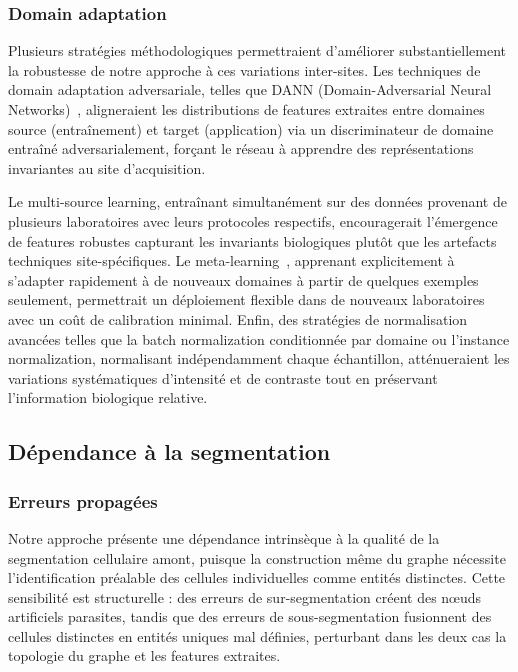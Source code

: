 \subsubsection{Domain adaptation}

Plusieurs stratégies méthodologiques permettraient d'améliorer substantiellement la robustesse de notre approche à ces variations inter-sites. Les techniques de domain adaptation adversariale, telles que DANN (Domain-Adversarial Neural Networks)~\cite{Ganin2015,Ganin2016}, aligneraient les distributions de features extraites entre domaines source (entraînement) et target (application) via un discriminateur de domaine entraîné adversarialement, forçant le réseau à apprendre des représentations invariantes au site d'acquisition.

Le multi-source learning, entraînant simultanément sur des données provenant de plusieurs laboratoires avec leurs protocoles respectifs, encouragerait l'émergence de features robustes capturant les invariants biologiques plutôt que les artefacts techniques site-spécifiques. Le meta-learning~\cite{Finn2017,Hospedales2021}, apprenant explicitement à s'adapter rapidement à de nouveaux domaines à partir de quelques exemples seulement, permettrait un déploiement flexible dans de nouveaux laboratoires avec un coût de calibration minimal. Enfin, des stratégies de normalisation avancées telles que la batch normalization conditionnée par domaine ou l'instance normalization, normalisant indépendamment chaque échantillon, atténueraient les variations systématiques d'intensité et de contraste tout en préservant l'information biologique relative.

\subsection{Dépendance à la segmentation}

\subsubsection{Erreurs propagées}

Notre approche présente une dépendance intrinsèque à la qualité de la segmentation cellulaire amont, puisque la construction même du graphe nécessite l'identification préalable des cellules individuelles comme entités distinctes. Cette sensibilité est structurelle : des erreurs de sur-segmentation créent des nœuds artificiels parasites, tandis que des erreurs de sous-segmentation fusionnent des cellules distinctes en entités uniques mal définies, perturbant dans les deux cas la topologie du graphe et les features extraites.

